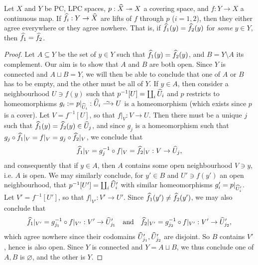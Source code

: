 \begin{thm}
	\label{thm:ULP}
	Let $X$ and $Y$ be PC, LPC spaces, $p: \widehat{X} \twoheadrightarrow X$ a covering space, and $f : Y \to X$ a continuous map. If $\widehat{f}_i : Y \to \widehat{X}$ are lifts of $f$ through $p$ ($i = 1,2$), then they either agree everywhere or they agree nowhere. That is, if $\widehat{f}_1(y) = \widehat{f}_2(y)$ for \emph{some} $y \in Y$, then $\widehat{f}_1 = \widehat{f}_2$.
\end{thm}
\begin{proof}
	Let $A \subseteq Y$ be the set of $y \in Y$ such that $\widehat{f}_1(y) = \widehat{f}_2(y)$, and $B = Y \setminus A$ its complement. Our aim is to show that $A$ and $B$ are both open. Since $Y$ is connected and $A \sqcup B = Y$, we will then be able to conclude that one of $A$ or $B$ has to be empty, and the other must be all of $Y$. If $y \in A$, then consider a neighbourhood $U \ni f(y)$ such that $p^{-1}[U] = \coprod_i \widehat{U}_i$ and $p$ restricts to homeomorphisms $g_i := p|_{\wh{U}_i} : \wh{U}_i \iso U$ is a homeomorphism (which exists since $p$ is a cover). Let $V = f^{-1}[U]$, so that $f|_V : V \to U$. Then there must be a unique $j$ such that $\widehat{f}_1(y) = \widehat{f}_2(y) \in \widehat{U}_j$, and since $g_j$ is a homeomorphism such that $g_j \circ \widehat{f}_1|_{V} = f|_{V} = g_j \circ \widehat{f}_2|_{V}$, we conclude that 
	\[
		\widehat{f}_1|_{V} = g_j^{-1} \circ f|_{V} = \widehat{f}_2|_{V} : V \to \widehat{U}_j,
	\]
	and consequently that if $y \in A$, then $A$ contains some open neighbourhood $V \ni y$, i.e. $A$ is open. We may similarly conclude, for $y' \in B$ and $U' \ni f(y')$ an open neighbourhood, that $p^{-1}[U'] = \coprod_i \widehat{U}_i'$ with similar homeomorphisms $g_i' = p|_{\widehat{U}'_i}$. Let $V' = f^{-1}[U']$, so that $f|_{V'} : V' \to U'$. Since $\widehat{f}_1(y') \neq \widehat{f}_2(y')$, we may also conclude that 
	\[
		\widehat{f}_1|_{V'} = g_{j_1}^{-1} \circ f|_{V'} : V' \to \widehat{U}_{j_1}' \quad \text{and} \quad \widehat{f}_2|_{V'} = g_{j_2}^{-1} \circ f|_{V'}:V' \to \widehat{U}_{j_2}',
	\]
	which agree nowhere since their codomains $\widehat{U}'_{j_1}, \widehat{U}'_{j_2}$ are disjoint. So $B$ contains $V'$, hence is also open. Since $Y$ is connected and $Y = A \sqcup B$, we thus conclude one of $A,B$ is $\varnothing$, and the other is $Y$.
\end{proof}

